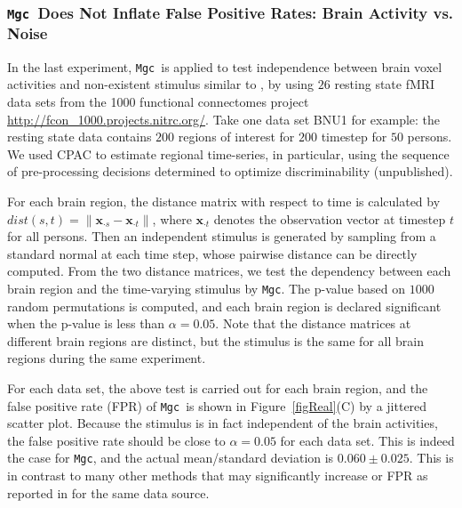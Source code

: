 \documentclass[11pt]{article}
\newcommand{\note}[2][]{\added[#1,remark={#2}]{}}
\providecommand{\sct}[1]{{\sc \texttt{#1}}}
\providecommand{\mb}[1]{\boldsymbol{#1}}
\newcommand{\Mgc}{\sct{Mgc}}
\newcommand{\jovo}[1]{{\note{jv: #1}}}
\newcommand{\cs}[1]{{\note{cs: #1}}}
\newcommand{\mbx}{\ensuremath{\mb{x}}}
\begin{document}
\subsubsection[Correct False Positive Rate]{\Mgc~Does Not Inflate False Positive Rates: Brain Activity vs. Noise}

In the last experiment, \Mgc~is applied to test independence between brain voxel activities and non-existent stimulus similar to \cite{EklundKnutsson2012}, by using $26$ resting state fMRI data sets from the 1000 functional connectomes project \url{http://fcon_1000.projects.nitrc.org/}. Take one data set BNU1 for example: the resting state data contains $200$ regions of interest for $200$ timestep for $50$ persons. We used CPAC\cs{cite CPAC} to estimate regional time-series, in particular, using the sequence of pre-processing decisions determined to optimize discriminability (unpublished).

For each brain region, the distance matrix with respect to time is calculated by $dist(s,t)=\|\mbx_{\cdot s}-\mbx_{\cdot t}\|$, where $\mbx_{\cdot t}$ denotes the observation vector at timestep $t$ for all persons. Then an independent stimulus is generated by sampling from a standard normal at each time step, whose pairwise distance can be directly computed. From the two distance matrices, we test the dependency between each brain region and the time-varying stimulus by \Mgc. The p-value based on $1000$ random permutations is computed, and each brain region is declared significant when the p-value is less than $\alpha=0.05$. Note that the distance matrices at different brain regions are distinct, but the stimulus is the same for all brain regions during the same experiment.

For each data set, the above test is carried out for each brain region, and the false positive rate (FPR) of \Mgc~is shown in Figure~\ref{figReal}(C) by a jittered scatter plot. %
\jovo{fix after fixing fig}\cs{fixed} Because the stimulus is in fact independent of the brain activities, the false positive rate should be close to $\alpha=0.05$ for each data set. This is indeed the case for \Mgc, and the actual mean/standard deviation is $0.060 \pm 0.025$. This is in contrast to many other methods that may significantly increase or FPR as reported in \cite{EklundKnutsson2012} for the same data source.
\end{document}
